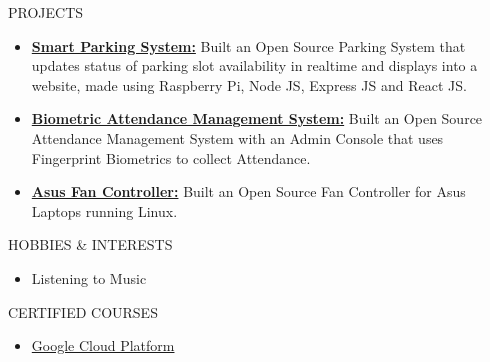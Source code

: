 \documentclass{resume}
\begin{document}
\vspace{0.8em}
\begin{rSection}{PROJECTS}
\begin{itemize}
    \item \textbf{\href{https://github.com/Arkapravo-Ghosh/Smart-Parking-System}{Smart Parking System:}} {Built an Open Source Parking System that updates status of parking slot availability in realtime and displays into a website, made using Raspberry Pi, Node JS, Express JS and React JS.}

    \item \textbf{\href{https://github.com/Arkapravo-Ghosh/attendance-monitoring-system}{Biometric Attendance Management System:}} {Built an Open Source Attendance Management System with an Admin Console that uses Fingerprint Biometrics to collect Attendance.}

    \item \textbf{\href{https://github.com/Arkapravo-Ghosh/asus-fan-mode}{Asus Fan Controller:}} {Built an Open Source Fan Controller for Asus Laptops running Linux.}
\end{itemize}
\end{rSection}
\vspace{0.8em}
\begin{rSection}{HOBBIES \& INTERESTS}
\begin{itemize}
    \item Listening to Music
\end{itemize}
\end{rSection}
\vspace{0.8em}
\begin{rSection}{CERTIFIED COURSES}
\begin{itemize}
    \item \href{https://www.cloudskillsboost.google/public_profiles/7594501c-7933-4fba-be9b-2a92ca3ee410}{Google Cloud Platform}
\end{itemize}
\end{rSection}
\end{document}
